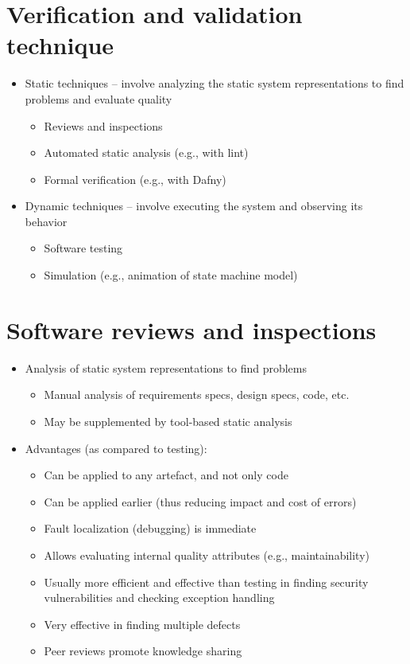 \documentclass[../ESOF_notes.tex]{subfiles}
\begin{document}
\section{Verification and validation technique}
    \begin{itemize}
        \item Static techniques – involve analyzing the static system representations to find problems and evaluate quality
        \begin{itemize}
            \item Reviews and inspections
            \item Automated static analysis (e.g., with lint)
            \item Formal verification (e.g., with Dafny)
        \end{itemize}
        \item Dynamic techniques – involve executing the system and observing its behavior
        \begin{itemize}
            \item Software testing
            \item Simulation (e.g., animation of state machine model)
        \end{itemize}
    \end{itemize}
    
\section{Software reviews and inspections}
    \begin{itemize}
        \item Analysis of static system representations to find problems
        \begin{itemize}
            \item Manual analysis of requirements specs, design specs, code, etc.
            \item May be supplemented by tool-based static analysis
        \end{itemize}
        \item Advantages (as compared to testing):
        \begin{itemize}
            \item Can be applied to any artefact, and not only code
            \item Can be applied earlier (thus reducing impact and cost of errors)
            \item Fault localization (debugging) is immediate
            \item Allows evaluating internal quality attributes (e.g., maintainability)
            \item Usually more efficient and effective than testing in finding security vulnerabilities and checking exception handling
            \item Very effective in finding multiple defects
            \item Peer reviews promote knowledge sharing
        \end{itemize}
    \end{itemize}
    
\end{document}
